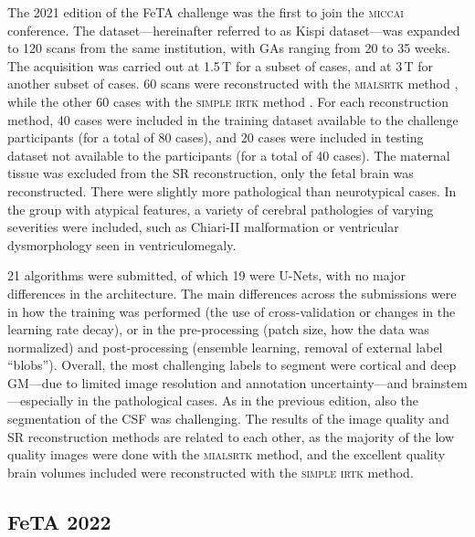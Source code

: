 The 2021 edition of the FeTA challenge \cite{FeTA2021_review, FeTA2021} was the first to join the \textsc{miccai} conference. The dataset---hereinafter referred to as Kispi dataset---was expanded to 120 scans from the same institution, with GAs ranging from 20 to 35 weeks. The acquisition was carried out at 1.5\,T for a subset of cases, and at 3\,T for another subset of cases. 60 scans were reconstructed with the \textsc{mialsrtk} method \cite{Tourbier2015, MIALSRTK}, while the other 60 cases with the \textsc{simple irtk} method \cite{Kuklisova2012, irtk-simple}. For each reconstruction method, 40 cases were included in the training dataset available to the challenge participants (for a total of 80 cases), and 20 cases were included in testing dataset not available to the participants (for a total of 40 cases). The maternal tissue was excluded from the SR reconstruction, only the fetal brain was reconstructed. There were slightly more pathological than neurotypical cases. In the group with atypical features, a variety of cerebral pathologies of varying severities were included, such as Chiari-II malformation or ventricular dysmorphology seen in ventriculomegaly.

21 algorithms were submitted, of which 19 were U-Nets, with no major differences in the architecture. The main differences across the submissions were in how the training was performed (the use of cross-validation or changes in the learning rate decay), or in the pre-processing (patch size, how the data was normalized) and post-processing (ensemble learning, removal of external label \enquote{blobs}). Overall, the most challenging labels to segment were cortical and deep GM---due to limited image resolution and annotation uncertainty---and brainstem---especially in the pathological cases. As in the previous edition, also the segmentation of the CSF was challenging. The results of the image quality and SR reconstruction methods are related to each other, as the majority of the low quality images were done with the \textsc{mialsrtk} method, and the excellent quality brain volumes included were reconstructed with the \textsc{simple irtk} method.

\subsection{FeTA 2022}

